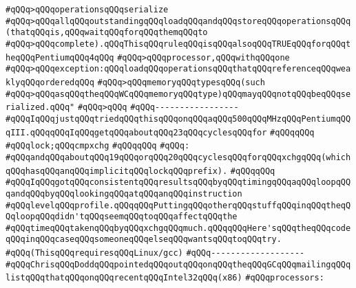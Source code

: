 \verb|#qQQq>qQQqoperationsqQQqserialize|\newline
\verb|#qQQq>qQQqallqQQqoutstandingqQQqloadqQQqandqQQqstoreqQQqoperationsqQQq(thatqQQqis,qQQqwaitqQQqforqQQqthemqQQqto|\newline
\verb|#qQQq>qQQqcomplete).qQQqThisqQQqruleqQQqisqQQqalsoqQQqTRUEqQQqforqQQqtheqQQqPentiumqQQq4qQQq|\newline
\verb|#qQQq>qQQqprocessor,qQQqwithqQQqone|\newline
\verb|#qQQq>qQQqexception:qQQqloadqQQqoperationsqQQqthatqQQqreferenceqQQqweaklyqQQqorderedqQQq|\newline
\verb|#qQQq>qQQqmemoryqQQqtypesqQQq(such|\newline
\verb|#qQQq>qQQqasqQQqtheqQQqWCqQQqmemoryqQQqtype)qQQqmayqQQqnotqQQqbeqQQqserialized.qQQq"|\newline
\verb|#qQQq>qQQq|\newline
\verb|#qQQq-----------------|\newline
\verb|#qQQqIqQQqjustqQQqtriedqQQqthisqQQqonqQQqaqQQq500qQQqMHzqQQqPentiumqQQqIII.qQQqqQQqIqQQqgetqQQqaboutqQQq23qQQqcyclesqQQqfor|\newline
\verb|#qQQqqQQq|\newline
\verb|#qQQqlock;qQQqcmpxchg|\newline
\verb|#qQQqqQQq|\newline
\verb|#qQQq:|\newline
\verb|#qQQqandqQQqaboutqQQq19qQQqorqQQq20qQQqcyclesqQQqforqQQqxchgqQQq(whichqQQqhasqQQqanqQQqimplicitqQQqlockqQQqprefix).|\newline
\verb|#qQQqqQQq|\newline
\verb|#qQQqIqQQqgotqQQqconsistentqQQqresultsqQQqbyqQQqtimingqQQqaqQQqloopqQQqandqQQqbyqQQqlookingqQQqatqQQqanqQQqinstruction|\newline
\verb|#qQQqlevelqQQqprofile.qQQqqQQqPuttingqQQqotherqQQqstuffqQQqinqQQqtheqQQqloopqQQqdidn'tqQQqseemqQQqtoqQQqaffectqQQqthe|\newline
\verb|#qQQqtimeqQQqtakenqQQqbyqQQqxchgqQQqmuch.qQQqqQQqHere'sqQQqtheqQQqcodeqQQqinqQQqcaseqQQqsomeoneqQQqelseqQQqwantsqQQqtoqQQqtry.|\newline
\verb|#qQQq(ThisqQQqrequiresqQQqLinux/gcc)|\newline
\verb|#qQQq-------------------|\newline
\verb|#qQQqChrisqQQqDoddqQQqpointedqQQqoutqQQqonqQQqtheqQQqGCqQQqmailingqQQqlistqQQqthatqQQqonqQQqrecentqQQqIntel32qQQq(x86)|\newline
\verb|#qQQqprocessors:|\newline
